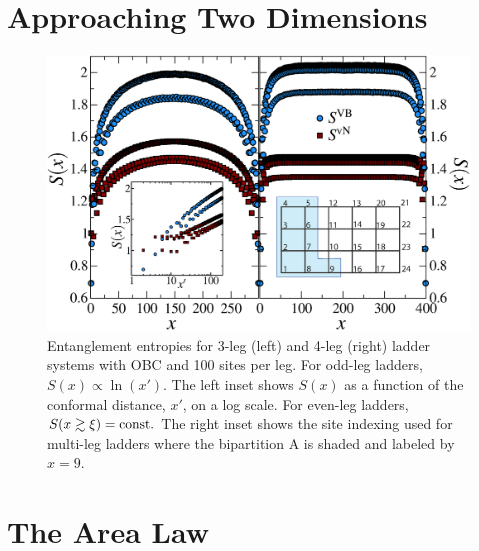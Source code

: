 \section{Approaching Two Dimensions}

\begin{figure} { \includegraphics[width=6.5in]{./figures/paper1/figure23new/fig23NEW.eps}
\caption[EEs for 3- \& 4-leg ladders]{
{\color{red}
Entanglement entropies for 3-leg (left)
and 4-leg (right) ladder systems with OBC and 100 sites per leg.  For
odd-leg ladders, $S(x)\propto\ln(x')$.  The left
inset shows $S(x)$ as a function of the conformal distance, $x'$, on a log
scale. For even-leg ladders, $S(x\gtrsim\xi)= {\rm const}.$
The right inset shows the site indexing used for multi-leg ladders where the
bipartition A is shaded and labeled by $x=9$. 
}
 \label{ladder} }} 
 \end{figure}
\section{The Area Law}

